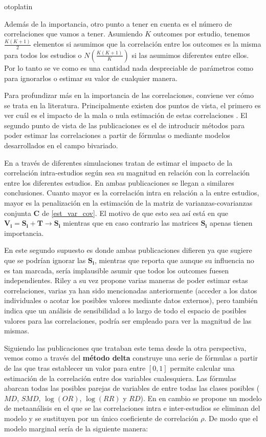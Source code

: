 otoplatin\documentclass[a4paper,openright,12pt]{report}
\begin{document}
Además de la importancia, otro punto a tener en cuenta es el número de correlaciones que vamos a tener. Asumiendo $K$ outcomes por estudio, tenemos $\frac{K(K+1)}{2}$ elementos si asumimos que la correlación entre los outcomes es la misma para todos los estudios o $N(\frac{K(K+1)}{K})$ si las asumimos diferentes entre ellos. Por lo tanto se ve como es una cantidad nada despreciable de parámetros como para ignorarlos o estimar su valor de cualquier manera.

Para profundizar más en la importancia de las correlaciones, conviene ver cómo se trata en la literatura. Principalmente existen dos puntos de vista, el primero es ver cuál es el impacto de la mala o nula estimación de estas correlaciones \cite{Ishak2008}\cite{Riley2009}. El segundo punto de vista de las publicaciones es el de introducir métodos para poder estimar las correlaciones a partir de fórmulas \cite{Wei2013} o mediante modelos \cite{Riley2007_2}\cite{Riley2008} desarrollados en el campo bivariado.

En \cite{Ishak2008}\cite{Riley2009} a través de diferentes simulaciones tratan de estimar el impacto de la correlación intra-estudios según sea su magnitud en relación con la correlación entre los diferentes estudios. En ambas publicaciones se llegan a similares conclusiones. Cuanto mayor es la correlación intra en relación a la entre estudios, mayor es la penalización en la estimación de la matriz de varianzas-covarianzas conjunta $\mathbf{C}$ de \ref{est_var_cov}. El motivo de que esto sea así está en que $\mathbf{V_{i}} = \mathbf{S_{i}}+\mathbf{T} \longrightarrow \mathbf{S_{i}}$ mientras que en caso contrario las matrices $\mathbf{S_{i}}$ apenas tienen importancia.

En este segundo supuesto es donde ambas publicaciones difieren ya que \cite{Ishak2008} sugiere que se podrían ignorar las $\mathbf{S_{i}}$, mientras que \cite{Riley2009} reporta que aunque su influencia no es tan marcada, sería implausible asumir que todos los outcomes fuesen independientes. Riley a su vez propone varias maneras de poder estimar estas correlaciones, varias ya han sido mencionadas anteriormente (acceder a los datos individuales o acotar los posibles valores mediante datos externos), pero también indica que un análisis de sensibilidad a lo largo de todo el espacio de posibles valores para las correlaciones, podría ser empleado para ver la magnitud de las mismas.  

Siguiendo las publicaciones que trataban este tema desde la otra perspectiva, vemos como \cite{Wei2013} a través del \textbf{método delta} \cite{Cox2005} construye una serie de fórmulas a partir de las que tras establecer un valor para \rho entre $\left[0,1\right]$ permite calcular una estimación de la correlación entre dos variables cualesquiera. Las fórmulas abarcan todas las posibles parejas de variables de entre todas las clases posibles ($MD$, $SMD$, $\log(OR)$, $\log(RR)$ y $RD$). En \cite{Riley2009} en cambio se propone un modelo de metaanálisis en el que se las correlaciones intra e inter-estudios se eliminan del modelo y se sustituyen por un único coeficiente de correlación $\rho$. De modo que el modelo marginal sería de la siguiente manera:
\end{document}
